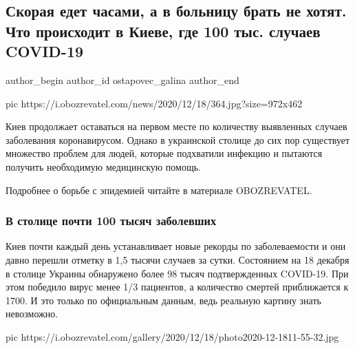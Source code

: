  
 
 
 
 
 
\subsection{Скорая едет часами, а в больницу брать не хотят. Что происходит в Киеве, где 100 тыс. случаев COVID-19}
\label{sec:18_12_2020.news.ua.obozrevatel.ostapovec_galina.1.covid_kiev_situation}
\ifcmt
	author_begin
   author_id ostapovec_galina
	author_end
\fi

\ifcmt
pic https://i.obozrevatel.com/news/2020/12/18/364.jpg?size=972x462
\fi

Киев продолжает оставаться на первом месте по количеству выявленных случаев
заболевания коронавирусом. Однако в украинской столице до сих пор существует
множество проблем для людей, которые подхватили инфекцию и пытаются получить
необходимую медицинскую помощь.

Подробнее о борьбе с эпидемией читайте в материале OBOZREVATEL.

\subsubsection{В столице почти 100 тысяч заболевших}

Киев почти каждый день устанавливает новые рекорды по заболеваемости и они
давно перешли отметку в 1,5 тысячи случаев за сутки. Состоянием на 18 декабря в
столице Украины обнаружено более 98 тысяч подтвержденных COVID-19. При этом
победило вирус менее 1/3 пациентов, а количество смертей приближается к 1700. И
это только по официальным данным, ведь реальную картину знать невозможно.

\ifcmt
pic https://i.obozrevatel.com/gallery/2020/12/18/photo2020-12-1811-55-32.jpg
\fi

